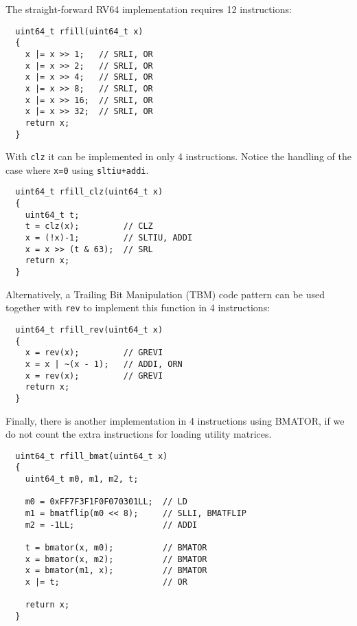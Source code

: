 The straight-forward RV64 implementation requires 12 instructions:

\begin{minipage}{\linewidth}
\begin{verbatim}
  uint64_t rfill(uint64_t x)
  {
    x |= x >> 1;   // SRLI, OR
    x |= x >> 2;   // SRLI, OR
    x |= x >> 4;   // SRLI, OR
    x |= x >> 8;   // SRLI, OR
    x |= x >> 16;  // SRLI, OR
    x |= x >> 32;  // SRLI, OR
    return x;
  }
\end{verbatim}
\end{minipage}

With {\tt clz} it can be implemented in only 4 instructions. Notice the
handling of the case where {\tt x=0} using {\tt sltiu+addi}.

\begin{minipage}{\linewidth}
\begin{verbatim}
  uint64_t rfill_clz(uint64_t x)
  {
    uint64_t t;
    t = clz(x);         // CLZ
    x = (!x)-1;         // SLTIU, ADDI
    x = x >> (t & 63);  // SRL
    return x;
  }
\end{verbatim}
\end{minipage}

Alternatively, a Trailing Bit Manipulation (TBM) code pattern can be used
together with {\tt rev} to implement this function in 4 instructions:

\begin{minipage}{\linewidth}
\begin{verbatim}
  uint64_t rfill_rev(uint64_t x)
  {
    x = rev(x);         // GREVI
    x = x | ~(x - 1);   // ADDI, ORN
    x = rev(x);         // GREVI
    return x;
  }
\end{verbatim}
\end{minipage}

Finally, there is another implementation in 4 instructions using BMATOR, if we do
not count the extra instructions for loading utility matrices.

\begin{minipage}{\linewidth}
\begin{verbatim}
  uint64_t rfill_bmat(uint64_t x)
  {
    uint64_t m0, m1, m2, t;

    m0 = 0xFF7F3F1F0F070301LL;  // LD
    m1 = bmatflip(m0 << 8);     // SLLI, BMATFLIP
    m2 = -1LL;                  // ADDI

    t = bmator(x, m0);          // BMATOR
    x = bmator(x, m2);          // BMATOR
    x = bmator(m1, x);          // BMATOR
    x |= t;                     // OR

    return x;
  }
\end{verbatim}
\end{minipage}

